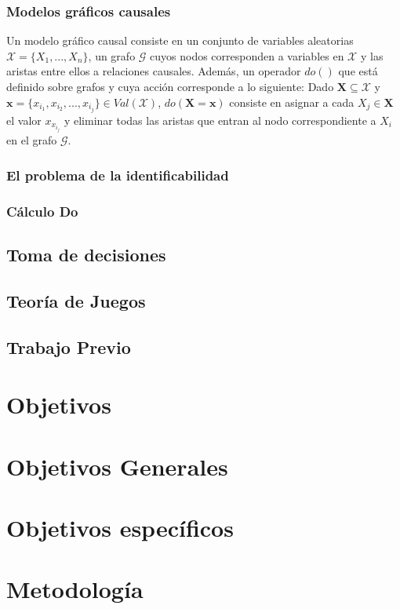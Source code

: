 \documentclass[11pt]{article}
\theoremstyle{plain}
\begin{document}
		\subsubsection{Modelos gráficos causales}
		Un modelo gráfico causal consiste en un conjunto de variables aleatorias $\mathcal{X}=\{ X_1,...,X_n \}$, un grafo $\mathcal{G}$ cuyos nodos corresponden a variables en $\mathcal{X}$ y las aristas entre ellos a relaciones causales. Además, un operador $do()$ que está definido sobre grafos y cuya acción corresponde a lo siguiente: Dado $\mathbf{X} \subseteq \mathcal{X}$ y $\mathbf{x} = \{ x_{i_1}, x_{i_2}, ... , x_{i_j} \} \in Val(\mathcal{X})$, $do(\mathbf{X} = \mathbf{x} )$ consiste en asignar a cada $X_j \in \mathbf{X}$ el valor $x_{x_{i_j}}$ y eliminar todas las aristas que entran al nodo correspondiente a $X_i$ en el grafo $\mathcal{G}$.
		\subsubsection{El problema de la identificabilidad}
		\subsubsection{Cálculo Do}
	\subsection{Toma de decisiones}
	\subsection{Teoría de Juegos}
	\subsection{Trabajo Previo}

\section{Objetivos}
	\section{Objetivos Generales}
	\section{Objetivos específicos}
	
\section{Metodología}
\end{document}
